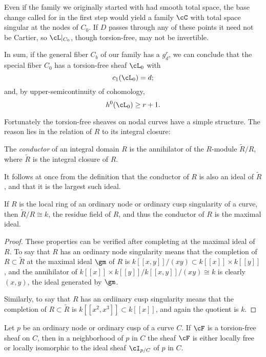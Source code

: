 Even if the family we originally started with had smooth total space, the base change called for in the first step would yield a family $\cC$ with  total space singular at the nodes of $C_0$. If $D$ passes through any of these points it need not be Cartier, 
so $\cL|_{C_0}$, though torsion-free, may not be invertible.

In sum, if the general fiber $C_b$ of our family has a $g^r_d$, we can conclude that the special fiber $C_0$ has a torsion-free sheaf $\cL_0$ with 
$$
c_1(\cL_0) = d;
$$
and, by upper-semicontinuity of cohomology,
$$
h^0(\cL_0) \geq r+1.
$$

Fortunately the torsion-free sheaves on nodal curves have a simple structure. The reason lies in the relation of $R$ to its integral closure:

\begin{definition}
The \emph{conductor} of an integral domain $R$ is the annihilator of the $R$-module
$\widetilde R/R$, where $\widetilde R$ is the integral closure of $R$.
\end{definition}

It follows at once from the definition that the conductor of $R$ is also an ideal of $\widetilde R$, and that it is the largest such ideal.

\begin{proposition}
If $R$ is the local ring of an ordinary node or ordinary cusp singularity of a curve, then  $\widetilde R/R \cong k$, the residue field of $R$, and thus the conductor of $R$ is the
maximal ideal. 
\end{proposition}

\begin{proof} These properties can be verified after completing at the maximal ideal of $R$.
To say that $R$ has an ordinary node singularity means that the completion of $R \subset \widetilde R$ at the maximal ideal $\gm$ of $R$ is $k[[x,y]]/(xy)\subset k[[x]]\times k[[y]]$, and 
the annihilator of $k[[x]]\times k[[y]]/k[[x,y]]/(xy) \cong k$ is clearly $(x,y)$, the ideal generated by $\gm$.

Similarly, to say that $R$ has an ordiinary cusp singularity means that the completion of 
$R \subset \widetilde R$ is $k[[x^2,x^3]]\subset k[[x]]$, and again the quotient is $k$.
\end{proof}

\begin{lemma}\label{torsion free at node}
Let $p$ be an ordinary node or ordinary cusp of a curve $C$. If $\cF$ is a torsion-free sheaf on $C$, then in a neighborhood of $p$ in $C$ the sheaf $\cF$ is either locally free or locally isomorphic to the ideal sheaf $\cI_{p/C}$ of $p$ in $C$.
\end{lemma}

